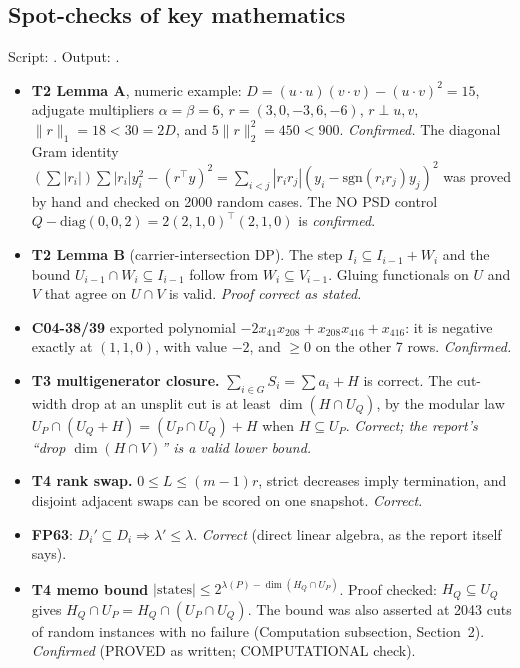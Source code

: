 \documentclass[11pt]{article}
\begin{document}
\subsection*{Spot-checks of key mathematics}
Script: . Output: .
\begin{itemize}
\item \textbf{T2 Lemma A}, numeric example: $D=(u\cdot u)(v\cdot v)-(u\cdot v)^2=15$, adjugate multipliers $\alpha=\beta=6$, $r=(3,0,-3,6,-6)$,
$r\perp u,v$, $\|r\|_1=18<30=2D$, and $5\|r\|_2^2=450<900$. \emph{Confirmed.} The diagonal Gram identity
$(\sum|r_i|)\sum|r_i|y_i^2-(r^\top y)^2=\sum_{i<j}|r_ir_j|(y_i-\mathrm{sgn}(r_ir_j)y_j)^2$ was proved by hand and checked on 2000 random cases. The NO PSD control
$Q-\mathrm{diag}(0,0,2)=2(2,1,0)^\top(2,1,0)$ is \emph{confirmed}.
\item \textbf{T2 Lemma B} (carrier-intersection DP). The step $I_i\subseteq I_{i-1}+W_i$ and the bound $U_{i-1}\cap W_i\subseteq I_{i-1}$ follow from $W_i\subseteq V_{i-1}$.
Gluing functionals on $U$ and $V$ that agree on $U\cap V$ is valid. \emph{Proof correct as stated.}
\item \textbf{C04-38/39} exported polynomial $-2x_{41}x_{208}+x_{208}x_{416}+x_{416}$: it is negative exactly at $(1,1,0)$, with value $-2$, and $\ge0$ on the other 7 rows. \emph{Confirmed.}
\item \textbf{T3 multigenerator closure.} $\sum_{i\in G}S_i=\sum a_i+H$ is correct. The cut-width drop at an unsplit cut is at least $\dim(H\cap U_Q)$, by the modular law
$U_P\cap(U_Q+H)=(U_P\cap U_Q)+H$ when $H\subseteq U_P$. \emph{Correct; the report's ``drop $\dim(H\cap V)$'' is a valid lower bound.}
\item \textbf{T4 rank swap.} $0\le L\le(m-1)r$, strict decreases imply termination, and disjoint adjacent swaps can be scored on one snapshot. \emph{Correct.}
\item \textbf{FP63}: $D_i'\subseteq D_i\Rightarrow\lambda'\le\lambda$. \emph{Correct} (direct linear algebra, as the report itself says).
\item \textbf{T4 memo bound} $|\text{states}|\le 2^{\lambda(P)-\dim(H_Q\cap U_P)}$. Proof checked: $H_Q\subseteq U_Q$ gives $H_Q\cap U_P=H_Q\cap(U_P\cap U_Q)$. The bound was also
asserted at 2043 cuts of random instances with no failure (Computation subsection, Section~2). \emph{Confirmed} (PROVED as written; COMPUTATIONAL check).
\end{itemize}
\end{document}
